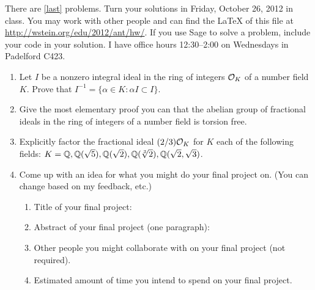 \documentclass{article}
\title{\dred{Math 581e, Fall 2012, Homework 4}}
\author{William Stein ({\tt wstein@uw.edu})}
\date{Due: Friday, October 26, 2012}
\begin{document}
\maketitle

{\color{dbluecolor}There are \ref{last} problems. Turn your solutions
  in Friday, October 26, 2012 in class.  You may work with other
  people and can find the \LaTeX{} of this file at
  \url{http://wstein.org/edu/2012/ant/hw/}.  If you use Sage to solve
  a problem, include your code in your solution. I have office hours
  12:30--2:00 on Wednesdays in Padelford C423.  }

\begin{enumerate}

\item Let $I$ be a nonzero integral ideal in the ring of integers
  $\mathcal{O}_K$ of a number field $K$.  {\color{dgreen} Prove that $I^{-1}=\{\alpha\in K:
  \alpha I \subset I\}$. } 

\item {\color{dgreen} Give the most elementary proof you can that the abelian group of
  fractional ideals in the ring of integers of a number field is
  torsion free.} 

\item Explicitly factor the fractional ideal $(2/3)\mathcal{O}_K$ for $K$
each of the following fields: $K=\mathbb{Q}, \mathbb{Q}(\sqrt{5}), \mathbb{Q}(\sqrt{2}), \mathbb{Q}(\sqrt[3]{2}), \mathbb{Q}(\sqrt{2},\sqrt{3})$.

\item\label{last}
{\color{dgreen} Come up with an idea for what you might do your final project on.}
(You can change based on my feedback, etc.)
\begin{enumerate}
\item Title of your final project:
\item Abstract of your final project (one paragraph):
\item Other people you might collaborate with on your final project (not required).
\item Estimated amount of time you intend to spend on your final project.
\end{enumerate}

\end{enumerate}
\end{document}
